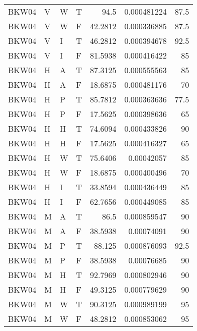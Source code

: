 \begin{longtable}{llllrrr}
    BKW04    & V     & W     & T          & 94.5       & 0.000481224 & 87.5     \\
    BKW04    & V     & W     & F          & 42.2812    & 0.000336885 & 87.5     \\
    BKW04    & V     & I     & T          & 46.2812    & 0.000394678 & 92.5     \\
    BKW04    & V     & I     & F          & 81.5938    & 0.000416422 & 85       \\
    BKW04    & H     & A     & T          & 87.3125    & 0.000555563 & 85       \\
    BKW04    & H     & A     & F          & 18.6875    & 0.000481176 & 70       \\
    BKW04    & H     & P     & T          & 85.7812    & 0.000363636 & 77.5     \\
    BKW04    & H     & P     & F          & 17.5625    & 0.000398636 & 65       \\
    BKW04    & H     & H     & T          & 74.6094    & 0.000433826 & 90       \\
    BKW04    & H     & H     & F          & 17.5625    & 0.000416327 & 65       \\
    BKW04    & H     & W     & T          & 75.6406    & 0.00042057  & 85       \\
    BKW04    & H     & W     & F          & 18.6875    & 0.000400496 & 70       \\
    BKW04    & H     & I     & T          & 33.8594    & 0.000436449 & 85       \\
    BKW04    & H     & I     & F          & 62.7656    & 0.000449085 & 85       \\
    BKW04    & M     & A     & T          & 86.5       & 0.000859547 & 90       \\
    BKW04    & M     & A     & F          & 38.5938    & 0.00074091  & 90       \\
    BKW04    & M     & P     & T          & 88.125     & 0.000876093 & 92.5     \\
    BKW04    & M     & P     & F          & 38.5938    & 0.00076685  & 90       \\
    BKW04    & M     & H     & T          & 92.7969    & 0.000802946 & 90       \\
    BKW04    & M     & H     & F          & 49.3125    & 0.000779629 & 90       \\
    BKW04    & M     & W     & T          & 90.3125    & 0.000989199 & 95       \\
    BKW04    & M     & W     & F          & 48.2812    & 0.000853062 & 95       \\

\end{longtable}
